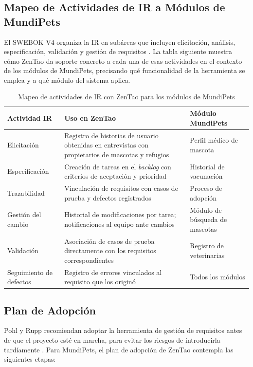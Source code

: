 \documentclass[journal,onecolumn]{IEEEtran}
\begin{document}
\subsection{Mapeo de Actividades de IR a Módulos de MundiPets}

El SWEBOK V4 organiza la IR en subáreas que incluyen elicitación, análisis, especificación,
validación y gestión de requisitos \cite{swebok2024}. La tabla siguiente muestra cómo ZenTao
da soporte concreto a cada una de esas actividades en el contexto de los módulos de MundiPets,
precisando qué funcionalidad de la herramienta se emplea y a qué módulo del sistema aplica.

\begin{table}[H]
	\caption{Mapeo de actividades de IR con ZenTao para los módulos de MundiPets}
	\label{tab:mapeo-ir}
	\begin{tabularx}{\textwidth}{|l|X|l|}
		\hline
		\textbf{Actividad IR} & \textbf{Uso en ZenTao} & \textbf{Módulo MundiPets} \\
		\hline
		Elicitación & Registro de historias de usuario obtenidas en entrevistas con propietarios de mascotas y refugios & Perfil médico de mascota \\
		\hline
		Especificación & Creación de tareas en el \textit{backlog} con criterios de aceptación y prioridad & Historial de vacunación \\
		\hline
		Trazabilidad & Vinculación de requisitos con casos de prueba y defectos registrados & Proceso de adopción \\
		\hline
		Gestión del cambio & Historial de modificaciones por tarea; notificaciones al equipo ante cambios & Módulo de búsqueda de mascotas \\
		\hline
		Validación & Asociación de casos de prueba directamente con los requisitos correspondientes & Registro de veterinarias \\
		\hline
		Seguimiento de defectos & Registro de errores vinculados al requisito que los originó & Todos los módulos \\
		\hline
	\end{tabularx}
\end{table}

\subsection{Plan de Adopción}

Pohl y Rupp recomiendan adoptar la herramienta de gestión de requisitos antes de que el proyecto
esté en marcha, para evitar los riesgos de introducirla tardíamente \cite{pohl2015}. Para
MundiPets, el plan de adopción de ZenTao contempla las siguientes etapas:
\end{document}
